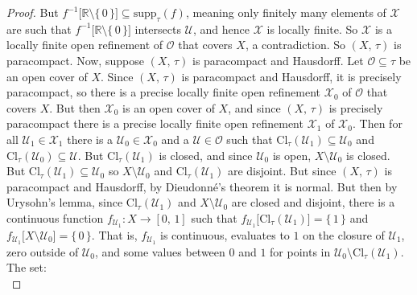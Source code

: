\documentclass{article}
\theoremstyle{plain}
\theoremstyle{normal}
\begin{document}
\begin{proof}
            But $f^{-1}\big[\mathbb{R}\setminus\{\,0\,\}\big]\subseteq\textrm{supp}_{\tau}(f)$,
            meaning only finitely many elements of $\mathcal{X}$ are such that
            $f^{-1}[\mathbb{R}\setminus\{\,0\,\}\big]$ intersects $\mathcal{U}$,
            and hence $\mathcal{X}$ is locally finite. So $\mathcal{X}$ is a
            locally finite open refinement of $\mathcal{O}$ that covers $X$,
            a contradiction. So $(X,\,\tau)$ is paracompact.
            Now, suppose $(X,\,\tau)$ is paracompact and Hausdorff. Let
            $\mathcal{O}\subseteq\tau$ be an open cover of $X$. Since
            $(X,\,\tau)$ is paracompact and Hausdorff, it is precisely
            paracompact, so there is a precise locally finite open refinement
            $\mathcal{X}_{0}$ of $\mathcal{O}$ that covers $X$. But then
            $\mathcal{X}_{0}$ is an open cover of $X$, and since $(X,\,\tau)$
            is precisely paracompact there is a precise locally finite open
            refinement $\mathcal{X}_{1}$ of $\mathcal{X}_{0}$. Then for all
            $\mathcal{U}_{1}\in\mathcal{X}_{1}$ there is a
            $\mathcal{U}_{0}\in\mathcal{X}_{0}$ and a
            $\mathcal{U}\in\mathcal{O}$ such that
            $\textrm{Cl}_{\tau}(\mathcal{U}_{1})\subseteq\mathcal{U}_{0}$ and
            $\textrm{Cl}_{\tau}(\mathcal{U}_{0})\subseteq\mathcal{U}$. But
            $\textrm{Cl}_{\tau}(\mathcal{U}_{1})$ is closed, and since
            $\mathcal{U}_{0}$ is open, $X\setminus\mathcal{U}_{0}$ is closed.
            But $\textrm{Cl}_{\tau}(\mathcal{U}_{1})\subseteq\mathcal{U}_{0}$
            so $X\setminus\mathcal{U}_{0}$ and
            $\textrm{Cl}_{\tau}(\mathcal{U}_{1})$ are disjoint. But since
            $(X,\,\tau)$ is paracompact and Hausdorff, by Dieudonn\'{e}'s
            theorem it is normal. But then by Urysohn's lemma, since
            $\textrm{Cl}_{\tau}(\mathcal{U}_{1})$ and
            $X\setminus\mathcal{U}_{0}$ are closed and disjoint, there is a
            continuous function $f_{\mathcal{U}_{1}}:X\rightarrow[0,\,1]$ such
            that
            $f_{\mathcal{U}_{1}}\big[\textrm{Cl}_{\tau}(\mathcal{U}_{1})\big]=\{\,1\,\}$
            and
            $f_{\mathcal{U}_{1}}\big[X\setminus\mathcal{U}_{0}]=\{\,0\,\}$.
            That is, $f_{\mathcal{U}_{1}}$ is continuous, evaluates to $1$ on
            the closure of $\mathcal{U}_{1}$, zero outside of $\mathcal{U}_{0}$,
            and some values between $0$ and $1$ for points in
            $\mathcal{U}_{0}\setminus\textrm{Cl}_{\tau}(\mathcal{U}_{1})$. The
            set:
            \begin{equation}

\end{equation}
\end{proof}
\end{document}

